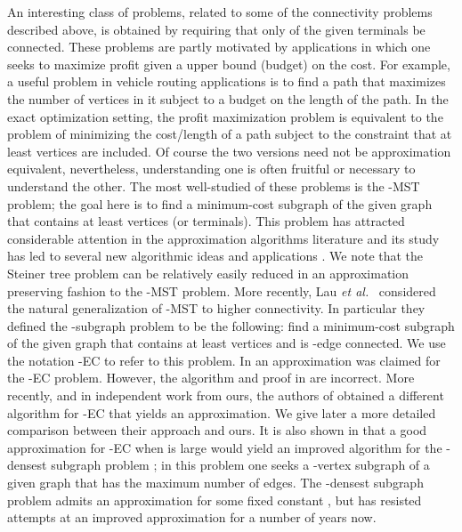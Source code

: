 \documentclass[11pt]{article}
\newcommand{\etal}{{\em et al.}\ }
\newcommand{\kec}[1]{-{\sc EC} }
\newcommand{\ke}{\kec{2}}
\begin{document}
An interesting class of problems, related to some of the connectivity
problems described above, is obtained by requiring that only  of
the given terminals be connected. These problems are partly motivated
by applications in which one seeks to maximize profit given a upper
bound (budget) on the cost.  For example, a useful problem in vehicle
routing applications is to find a path that maximizes the number of
vertices in it subject to a budget  on the length of the path. In
the exact optimization setting, the profit maximization problem is
equivalent to the problem of minimizing the cost/length of a path
subject to the constraint that at least  vertices are included. Of
course the two versions need not be approximation equivalent,
nevertheless, understanding one is often fruitful or necessary to
understand the other. The most well-studied of these problems is the
-MST problem; the goal here is to find a minimum-cost subgraph of
the given graph  that contains at least  vertices (or
terminals). This problem has attracted considerable attention in the
approximation algorithms literature and its study has led to several
new algorithmic ideas and applications
\cite{AwerbuchABV95,Garg96,Garg05,ChaudhuriGRT03,orienteering}.  We
note that the Steiner tree problem can be relatively easily reduced in
an approximation preserving fashion to the -MST problem.  More
recently, Lau \etal \cite{LauNSS07} considered the natural
generalization of -MST to higher connectivity. In particular they
defined the -subgraph problem to be the following: find a
minimum-cost subgraph of the given graph  that contains at least
 vertices and is -edge connected. We use the notation
\kec{\lambda} to refer to this problem. In \cite{LauNSS07} an
 approximation was claimed for the \ke problem.  However,
the algorithm and proof in \cite{LauNSS07} are incorrect.  More
recently, and in independent work from ours, the authors of
\cite{LauNSS07} obtained a different algorithm for \ke that yields an
 approximation. We give later a more detailed comparison
between their approach and ours. It is also shown in \cite{LauNSS07}
that a good approximation for \kec{\lambda} when  is large
would yield an improved algorithm for the -densest subgraph problem
\cite{FeigeKP01}; in this problem one seeks a -vertex subgraph of a
given graph  that has the maximum number of edges. The -densest
subgraph problem admits an  approximation for some
fixed constant  \cite{FeigeKP01}, but has resisted
attempts at an improved approximation for a number of years now.
\end{document}
